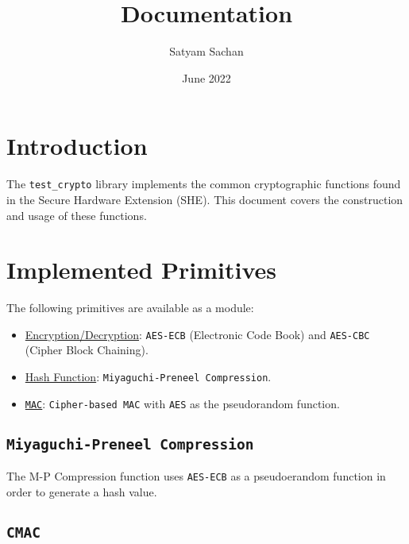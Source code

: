 \documentclass{article}
\title{Documentation}
\author{Satyam Sachan}
\date{June 2022}
\begin{document}
	
	\maketitle
	
	\section{Introduction}
	The \texttt{test\_crypto} library implements the common cryptographic functions found in the Secure Hardware Extension (SHE). This document covers the construction and usage of these functions.
	
	\section{Implemented Primitives}
	The following primitives are available as a module:
	\begin{itemize}
		\item \underline{Encryption/Decryption}: \texttt{AES-ECB} (Electronic Code Book) and \texttt{AES-CBC} (Cipher Block Chaining).
		\item \underline{Hash Function}: \texttt{Miyaguchi-Preneel Compression}.
		\item \underline{\texttt{MAC}}: \texttt{Cipher-based MAC} with \texttt{AES} as the pseudorandom function.
	\end{itemize}
	
	\subsection{\texttt{Miyaguchi-Preneel Compression}}
	The M-P Compression function uses \texttt{AES-ECB} as a pseudoerandom function in order to generate a hash value. 
	\subsection{\texttt{CMAC}}
	
\end{document}
